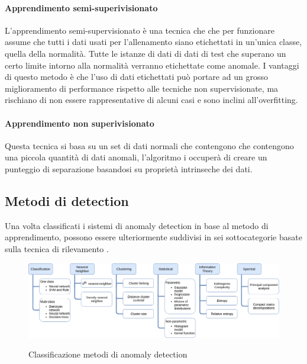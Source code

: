 \paragraph{Apprendimento semi-superivisionato}

L'apprendimento semi-supervisionato è una tecnica che che per funzionare assume che tutti i dati usati per l'allenamento siano etichettati in un'unica classe, quella della normalità. Tutte le istanze di dati di dati di test che superano un certo limite intorno alla normalità verranno etichettate come anomale. I vantaggi di questo metodo è che l'uso di dati etichettati può portare ad un grosso miglioramento di performance rispetto alle tecniche non supervisionate, ma rischiano di non essere rappresentative di alcuni casi e sono inclini all'overfitting.

\paragraph{Apprendimento non superivisionato}

Questa tecnica si basa su un set di dati normali che contengono che contengono una piccola quantità di dati anomali, l'algoritmo i occuperà di creare un punteggio di separazione basandosi su proprietà intrinseche dei dati.


\subsection{Metodi di detection}

Una volta classificati i sistemi di anomaly detection in base al metodo di apprendimento, possono essere ulteriormente suddivisi in sei sottocategorie basate sulla tecnica di rilevamento \cite{anomaly_detection_survey_1_network, anomaly_detection_classification}.


\begin{figure}[]
    \begin{center}
    \label{fig:anomaly_classification}
    \includegraphics[width=\hsize]{images/reti_neurali/metodi_detection.png}
    \caption{Classificazione metodi di anomaly detection}
    \centering
    \end{center}
\end{figure}

